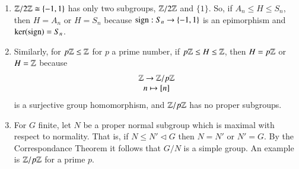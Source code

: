 \begin{eg}
        \leavevmode
        \begin{enumerate}
                \item $\mathbb Z/2\mathbb Z \cong \{-1,1\}$ has only two subgroups, $\mathbb Z/2\mathbb Z$ and $\{1\}$. So, if $A_n \leq H \leq S_n$, then $H = A_n$ or $H = S_n$ because $\operatorname{sign}:S_n\rightarrow \{-1,1\}$ is an epimorphism and $\ker(\operatorname{sign}) = S_n$.
                \item Similarly, for $p\mathbb Z\leq \mathbb Z$ for $p$ a prime number, if $p\mathbb Z \leq H \leq \mathbb Z$, then $H = p\mathbb Z$ or $H = \mathbb Z$ because \begin{equation}
                                \begin{array}{c} \mathbb Z\rightarrow \mathbb Z/p\mathbb Z \\ n\mapsto {[n]} \end{array}
                \end{equation}
                        is a surjective group homomorphism, and $\mathbb Z/p\mathbb Z$ has no proper subgroups.
                \item For $G$ finite, let $N$ be a proper normal subgroup which is maximal with respect to normality. That is, if $N \leq N' \vartriangleleft G$ then $N = N'$ or $N' = G$. By the Correspondance Theorem it follows that $G/N$ is a simple group. An example is $\mathbb Z/p\mathbb Z$ for a prime $p$.
        \end{enumerate}
\end{eg}

